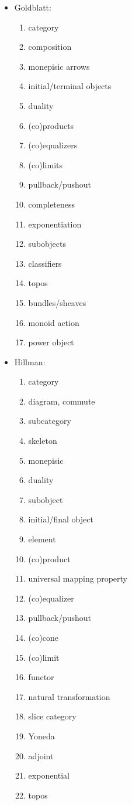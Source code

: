 \documentclass[11pt,openany]{book}
\begin{document}
\begin{itemize}
\item Goldblatt:~\cite{Goldblatt:1984:Topoi}
\begin{enumerate}
  \item category
  \item composition
  \item monepisic arrows
  \item initial/terminal objects
  \item duality
  \item (co)products
  \item (co)equalizers
  \item (co)limits
  \item pullback/pushout
  \item completeness
  \item exponentiation
  \item subobjects
  \item classifiers
  \item topos
  \item bundles/sheaves
  \item monoid action
  \item power object
\end{enumerate}

\item Hillman:~\cite{Hillman:2001:CatPrimer}
\begin{enumerate}
  \item category
  \item diagram, commute
  \item subcategory
  \item skeleton
  \item monepisic
  \item duality
  \item subobject
  \item initial/final object
  \item element
  \item (co)product
  \item universal mapping property
  \item (co)equalizer
  \item pullback/pushout
  \item (co)cone
  \item (co)limit
  \item functor
  \item natural transformation
  \item slice category
  \item Yoneda
  \item adjoint
  \item exponential
  \item topos
\end{enumerate}


\end{itemize}
\end{document}
